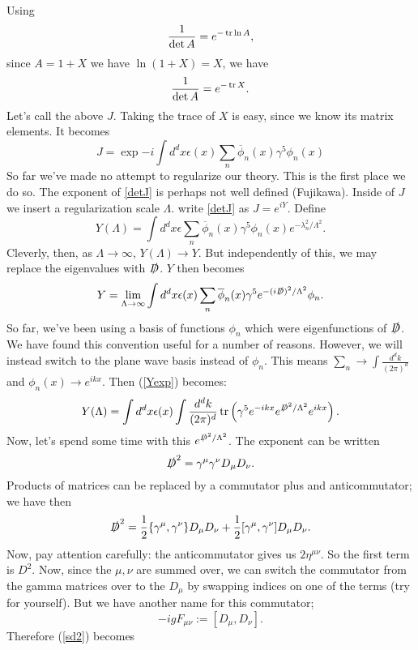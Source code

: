 \documentclass[main.tex]{subfiles}
\begin{document}
Using
\[
\frac{1}{\det A} = e^{-\tr \ln A}, 
\]
since $A = 1+X$ we have $\ln (1 + X) = X$, we have
\[
\frac{1}{\det A} = e^{-\tr X}.
\]
Let's call the above $J$. Taking the trace of $X$ is easy, since we know its matrix elements. It becomes
\begin{equation} \label{detJ}
J = \exp{ 
-i \int d^d x \epsilon (x) \sum_n \overline{\phi}_n (x) \gamma^5 \phi_n (x)
}
\end{equation}
So far we've made no attempt to regularize our theory. This is the first place we do so. The exponent of \ref{detJ} is perhaps not well defined (Fujikawa). Inside of $J$ we insert a regularization scale $\Lambda$. write \ref{detJ} as $J = e^{iY}$. Define
\[
Y(\Lambda) = \int d^d x \epsilon \sum_n \overline{\phi}_n (x) \gamma^5 \phi_n (x) e^{-\lambda^2_n/\Lambda^2}.
\]
Cleverly, then, as $\Lambda \to \infty$, $Y(\Lambda) \to Y$. But independently of this, we may replace the eigenvalues with $\slashed{D}$. $Y$ then becomes
\begin{equation} \label{Yexp}
Y = \lim_{\Lambda \to \infty} \int d^d x \epsilon (x) \sum_n \overline{\phi}_n (x) \gamma^5 e^{-(i\slashed{D})^2/\Lambda^2} \phi_n.
\end{equation}
So far, we've been using a basis of functions $\phi_n$ which were eigenfunctions of $\slashed{D}$. We have found this convention useful for a number of reasons. However, we will instead switch to the plane wave basis instead of $\phi_n$. This means $\sum_n \to \int \frac{d^d k}{(2\pi)^d}$ and $\phi_n (x) \to e^{ikx}$. Then (\ref{Yexp}) becomes:
\[
Y(\Lambda) = \int d^d x \epsilon (x) \int \frac{d^d k}{(2\pi)^d} \tr \left(
\gamma^5 e^{-ikx} e^{\slashed{D}^2/\Lambda^2} e^{ikx} 
\right).
\]
Now, let's spend some time with this $e^{\slashed{D}^2/\Lambda^2}$. The exponent can be written
\[
\slashed{D}^2 = \gamma^\mu \gamma^\nu D_\mu D_\nu.
\]
Products of matrices can be replaced by a commutator plus and anticommutator; we have then
\begin{equation} \label{sd2}
\slashed{D}^2 = \frac{1}{2} \{ \gamma^{\mu},\gamma^\nu \} D_\mu D_\nu + \frac{1}{2} [\gamma^\mu,\gamma^\nu] D_\mu D_\nu.
\end{equation}
Now, pay attention carefully: the anticommutator gives us $2\eta^{\mu \nu}$. So the first term is $D^2$. Now, since the $\mu,\nu$ are summed over, we can switch the commutator from the gamma matrices over to the $D_\mu$ by swapping indices on one of the terms (try for yourself). But we have another name for this commutator;
\[
-ig F_{\mu \nu} := [D_\mu,D_\nu].
\]
Therefore (\ref{sd2}) becomes
\end{document}
